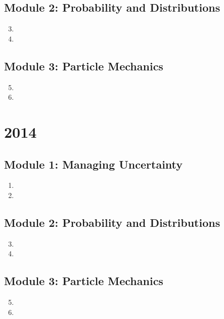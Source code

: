 \documentclass{solutionsmannual}
\begin{document}
\section{Module 2: Probability and Distributions}
\begin{enumerate}[label=\bfseries  \arabic*.]\setcounter{enumi}{2}
\item 
\item 
\end{enumerate}
\section{Module 3: Particle Mechanics}
\begin{enumerate}[label=\bfseries  \arabic*.]\setcounter{enumi}{4}
\item 
\item 
\end{enumerate}

\chapter{2014}
\section{Module 1: Managing Uncertainty}
\begin{enumerate}[label=\bfseries  \arabic*.]\setcounter{enumi}{0}
\item 
\item 
\end{enumerate}
\section{Module 2: Probability and Distributions}
\begin{enumerate}[label=\bfseries  \arabic*.]\setcounter{enumi}{2}
\item 
\item 
\end{enumerate}
\section{Module 3: Particle Mechanics}
\begin{enumerate}[label=\bfseries  \arabic*.]\setcounter{enumi}{4}
\item 
\item 
\end{enumerate}
\end{document}
